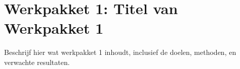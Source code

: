 \section{Werkpakket 1: Titel van Werkpakket 1}
Beschrijf hier wat werkpakket 1 inhoudt, inclusief de doelen, methoden, en verwachte resultaten.
